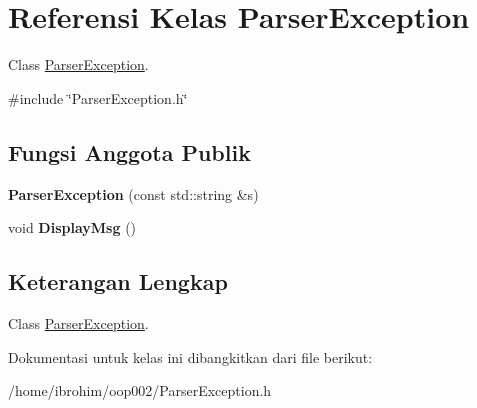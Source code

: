 \hypertarget{classParserException}{}\section{Referensi Kelas Parser\+Exception}
\label{classParserException}


Class \hyperlink{classParserException}{Parser\+Exception}.  




{\ttfamily \#include \char`\"{}Parser\+Exception.\+h\char`\"{}}

\subsection*{Fungsi Anggota Publik}
\begin{DoxyCompactItemize}
\item 
\hypertarget{classParserException_a73e9c79df9bacd24553686e317461a18}{}{\bfseries Parser\+Exception} (const std\+::string \&s)\label{classParserException_a73e9c79df9bacd24553686e317461a18}

\item 
\hypertarget{classParserException_a67db03e39544827abd7a5d94a09818ec}{}void {\bfseries Display\+Msg} ()\label{classParserException_a67db03e39544827abd7a5d94a09818ec}

\end{DoxyCompactItemize}


\subsection{Keterangan Lengkap}
Class \hyperlink{classParserException}{Parser\+Exception}. 

Dokumentasi untuk kelas ini dibangkitkan dari file berikut\+:\begin{DoxyCompactItemize}
\item 
/home/ibrohim/oop002/Parser\+Exception.\+h\end{DoxyCompactItemize}
